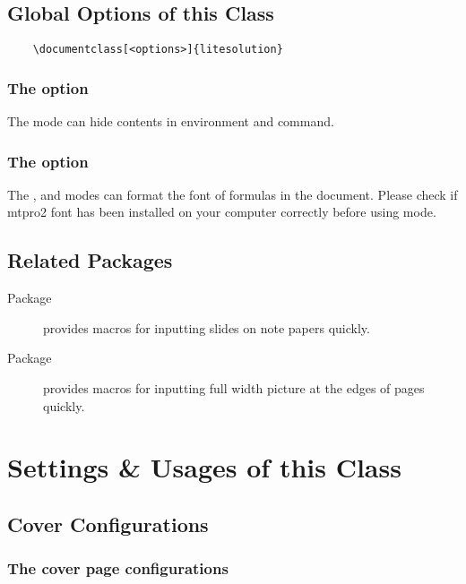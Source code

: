 \documentclass[mtpro2,twoside,openany]{litesolution}
\begin{document}
\section{Global Options of this Class}

\begin{verbatim}
    \documentclass[<options>]{litesolution}
\end{verbatim}

\subsection{The  option}

The  mode can hide contents in  environment and  command.

\subsection{The  option}

The ,  and  modes can format the font of formulas in the document. Please check if mtpro2 font has been installed on your computer correctly before using  mode.

\section{Related Packages}
\begin{description}
    \item[Package ] provides macros for inputting slides on note papers quickly.
    \item[Package ] provides macros for inputting full width picture at the edges of pages quickly.
\end{description}

\chapter{Settings \& Usages of this Class}

\section{Cover Configurations}

\subsection{The cover page configurations}
\end{document}
